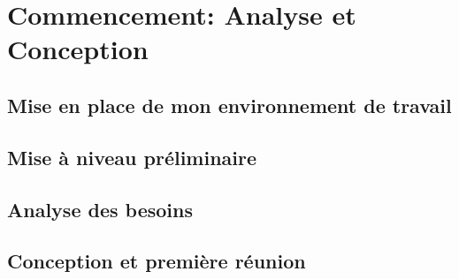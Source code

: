 \section{Commencement: Analyse et Conception}

\subsection{Mise en place de mon environnement de travail}

\subsection{Mise à niveau préliminaire}

\subsection{Analyse des besoins}

\subsection{Conception et première réunion}